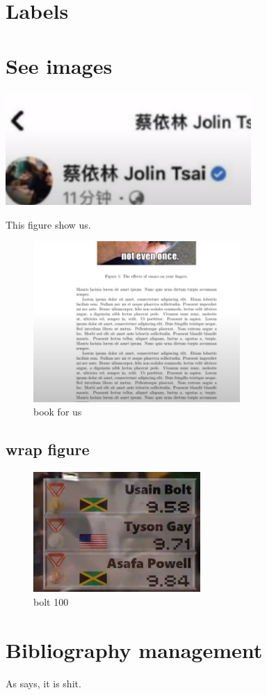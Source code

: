 \documentclass{article}
\begin{document}
\section{Labels}




\section{See images}
\begin{center}
    \includegraphics[width=0.7\textwidth,angle=90]{arch.png}
\end{center}

\blindtext
This figure show us.

\begin{figure}
    \centering
    \includegraphics[width=0.7\textwidth,angle=90]{book.png}
    \caption{book for us}
\end{figure}

\blindtext

\blindtext

\blindtext

\subsection{wrap figure}

\begin{figure}
    \centering
    \includegraphics[width=2.5in]{bolt.png}
    \caption{bolt 100}
\end{figure}


\section{Bibliography management}

As \cite{arbelaez2011contour} says, it is shit.  

% 
\printbibliography
\end{document}
